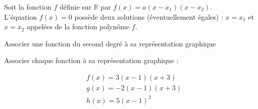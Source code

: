 	\begin{bprop}
		Soit la fonction $f$ définie sur $\mathbb{R}$ par $f(x)=a\left(x-x_{1}\right)\left(x-x_{2}\right)$.\\
		L'équation $f(x)=0$ possède deux solutions (éventuellement égales) : $x=x_{1}$ et $x=x_{2}$ appelées  de la fonction polynôme $f$.
	\end{bprop}
	
	\begin{bmethodet}{Associer une fonction du second degré à sa représentation graphique}
		
		\begin{minipage}[c]{0.42\linewidth}
			Associer chaque fonction à sa représentation graphique :
			
			$$
			\begin{aligned}
				& f(x)=3(x-1)(x+3) \\
				& g(x)=-2(x-1)(x+3) \\
				& h(x)=5(x-1)^{2}
			\end{aligned}
			$$
		\end{minipage} \hfill
		\begin{minipage}[c]{0.58\linewidth}
			\begin{center}
			\end{center}
		\end{minipage}
		
		

\end{bmethodet}
